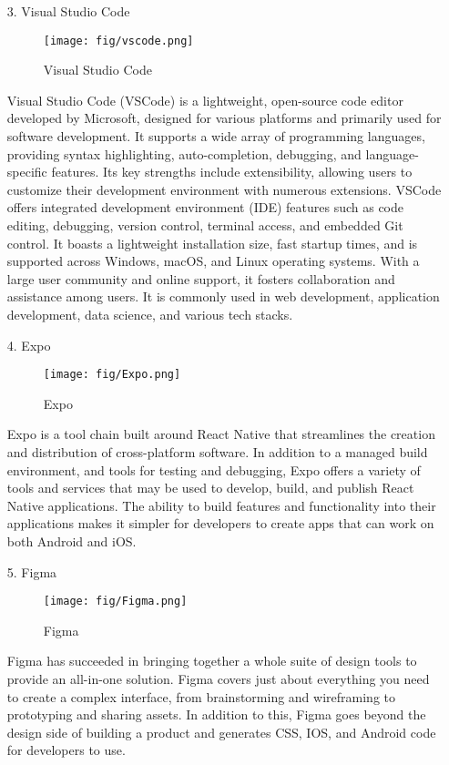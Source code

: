 \documentclass[conference]{IEEEtran}
\begin{document}
\begin{enumerate}
    \item[3.]Visual Studio Code
    \begin{figure}[h]
    \centering
    \textbf{}    
    \texttt{[image: fig/vscode.png]}
    \label{fig:Visual Studio Code}
    \caption{Visual Studio Code} 
    \end{figure}
    \item[]Visual Studio Code (VSCode) is a lightweight, open-source code editor developed by Microsoft, designed for various platforms and primarily used for software development. It supports a wide array of programming languages, providing syntax highlighting, auto-completion, debugging, and language-specific features. Its key strengths include extensibility, allowing users to customize their development environment with numerous extensions. VSCode offers integrated development environment (IDE) features such as code editing, debugging, version control, terminal access, and embedded Git control. It boasts a lightweight installation size, fast startup times, and is supported across Windows, macOS, and Linux operating systems. With a large user community and online support, it fosters collaboration and assistance among users. It is commonly used in web development, application development, data science, and various tech stacks.\\

    \item[4.]Expo
    \begin{figure}[h]
    \centering
    \texttt{[image: fig/Expo.png]}
    \label{fig:Expo}
    \caption{Expo} 
    \end{figure}
    \item[]Expo is a tool chain built around React Native that streamlines the creation and distribution of cross-platform software. In addition to a managed build environment, and tools for testing and debugging, Expo offers a variety of tools and services that may be used to develop, build, and publish React Native applications. The ability to build features and functionality into their applications makes it simpler for developers to create apps that can work on both Android and iOS.\\ 

    \item[5.]Figma \cite{staiano2022designing}
    \begin{figure}[h]
    \centering
    \texttt{[image: fig/Figma.png]}
    \label{fig:Figma}
    \caption{Figma} 
    \end{figure}
    \item[]Figma has succeeded in bringing together a whole suite of design tools to provide an all-in-one solution. Figma covers just about everything you need to create a complex interface, from brainstorming and wireframing to prototyping and sharing assets. In addition to this, Figma goes beyond the design side of building a product and generates CSS, IOS, and Android code for developers to use.\\


\end{enumerate}
\end{document}
